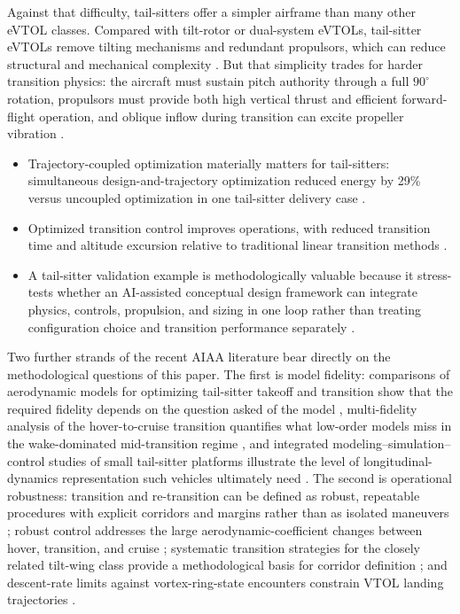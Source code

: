 Against that difficulty, tail-sitters offer a simpler airframe than
many other eVTOL classes. Compared with tilt-rotor or dual-system
eVTOLs, tail-sitter eVTOLs remove tilting mechanisms and redundant
propulsors, which can reduce structural and mechanical complexity
\citep{yang2024}. But that simplicity trades for harder transition
physics: the aircraft must sustain pitch authority through a full
$90^{\circ}$ rotation, propulsors must provide both high vertical
thrust and efficient forward-flight operation, and oblique inflow
during transition can excite propeller vibration \citep{yang2024}.

\begin{itemize}[nosep]
\item Trajectory-coupled optimization materially matters for
  tail-sitters: simultaneous design-and-trajectory optimization reduced
  energy by 29\% versus uncoupled optimization in one tail-sitter
  delivery case \citep{kaneko2024}.
\item Optimized transition control improves operations, with reduced
  transition time and altitude excursion relative to traditional
  linear transition methods \citep{yang2024}.
\item A tail-sitter validation example is methodologically valuable
  because it stress-tests whether an AI-assisted conceptual design
  framework can integrate physics, controls, propulsion, and sizing in
  one loop rather than treating configuration choice and transition
  performance separately \citep{kaneko2024}.
\end{itemize}

Two further strands of the recent AIAA literature bear directly on
the methodological questions of this paper. The first is model
fidelity: comparisons of aerodynamic models for optimizing
tail-sitter takeoff and transition show that the required fidelity
depends on the question asked of the model \citep{anderson2021},
multi-fidelity analysis of the hover-to-cruise transition quantifies
what low-order models miss in the wake-dominated mid-transition
regime \citep{arias2025}, and integrated
modeling--simulation--control studies of small tail-sitter platforms
illustrate the level of longitudinal-dynamics representation such
vehicles ultimately need \citep{pricker2023}. The second is
operational robustness: transition and re-transition can be defined
as robust, repeatable procedures with explicit corridors and margins
rather than as isolated maneuvers \citep{marvakov2021}; robust
control addresses the large aerodynamic-coefficient changes between
hover, transition, and cruise \citep{kumar2024}; systematic
transition strategies for the closely related tilt-wing class
provide a methodological basis for corridor definition
\citep{may2024}; and descent-rate limits against vortex-ring-state
encounters constrain VTOL landing trajectories \citep{jeong2024}.

